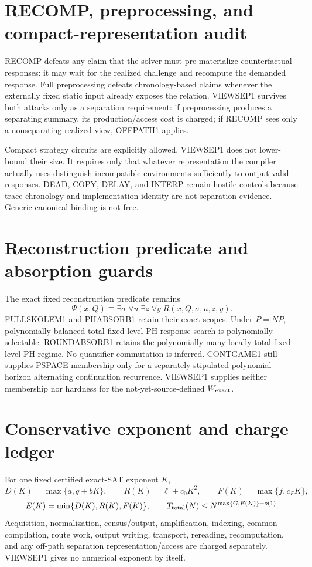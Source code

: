 \documentclass[11pt]{article}
\begin{document}
\section*{RECOMP, preprocessing, and compact-representation audit}
RECOMP defeats any claim that the solver must pre-materialize counterfactual responses: it may wait for the realized challenge and recompute the demanded response. Full preprocessing defeats chronology-based claims whenever the externally fixed static input already exposes the relation. VIEWSEP1 survives both attacks only as a separation requirement: if preprocessing produces a separating summary, its production/access cost is charged; if RECOMP sees only a nonseparating realized view, OFFPATH1 applies.

Compact strategy circuits are explicitly allowed. VIEWSEP1 does not lower-bound their size. It requires only that whatever representation the compiler actually uses distinguish incompatible environments sufficiently to output valid responses. DEAD, COPY, DELAY, and INTERP remain hostile controls because trace chronology and implementation identity are not separation evidence. Generic canonical binding is not free.

\section*{Reconstruction predicate and absorption guards}
The exact fixed reconstruction predicate remains
\[
\Psi(x,Q)\equiv
\exists\sigma\;\forall u\;\exists z\;\forall y\;
R(x,Q,\sigma,u,z,y).
\]
FULLSKOLEM1 and PHABSORB1 retain their exact scopes. Under $P=NP$, polynomially balanced total fixed-level-PH response search is polynomially selectable. ROUNDABSORB1 retains the polynomially-many locally total fixed-level-PH regime. No quantifier commutation is inferred. CONTGAME1 still supplies PSPACE membership only for a separately stipulated polynomial-horizon alternating continuation recurrence. VIEWSEP1 supplies neither membership nor hardness for the not-yet-source-defined $W_{\rm exact}$.

\section*{Conservative exponent and charge ledger}
For one fixed certified exact-SAT exponent $K$,
\[
D(K)=\max\{a,q+bK\},\qquad
R(K)=\ell+c_0K^2,\qquad
F(K)=\max\{f,c_FK\},
\]
\[
E(K)=\min\{D(K),R(K),F(K)\},
\qquad
T_{\rm total}(N)\le N^{\max\{G,E(K)\}+o(1)}.
\]
Acquisition, normalization, census/output, amplification, indexing, common compilation, route work, output writing, transport, rereading, recomputation, and any off-path separation representation/access are charged separately. VIEWSEP1 gives no numerical exponent by itself.
\end{document}
